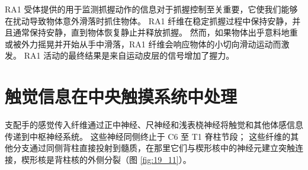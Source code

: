 RA1 受体提供的用于监测抓握动作的信息对于抓握控制至关重要，它使我们能够在扰动导致物体意外滑落时抓住物体。 
RA1 纤维在稳定抓握过程中保持安静，并且通常保持安静，直到物体恢复静止并释放抓握。 
然而，如果物体出乎意料地重或被外力摇晃并开始从手中滑落，RA1 纤维会响应物体的小切向滑动运动而激发。 
RA1 活动的最终结果是来自运动皮层的信号增加了握力。


\section{触觉信息在中央触摸系统中处理}
支配手的感觉传入纤维通过正中神经、尺神经和浅表桡神经将触觉和其他体感信息传递到中枢神经系统。 
这些神经同侧终止于 C6 至 T1 脊柱节段； 这些纤维的其他分支通过同侧背柱直接投射到髓质，在那里它们与楔形核中的神经元建立突触连接，楔形核是背柱核的外侧分裂（图 \ref{fig:19_11}）。

